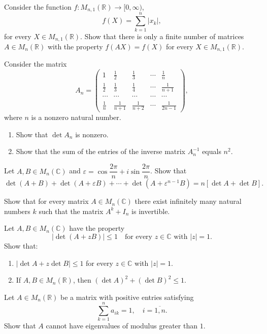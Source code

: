 \documentclass[12pt]{article}
\begin{document}
\begin{problems}
\item Consider the function $f : M_{n,1}(\mathbb{R}) \to [0,\infty)$,
$$f(X) = \sum_{k=1}^{n} |x_k|,$$
for every $X \in M_{n,1}(\mathbb{R})$. Show that there is only a finite number of matrices $A \in M_n(\mathbb{R})$ with the property $f(AX) = f(X)$ for every $X \in M_{n,1}(\mathbb{R})$.

\item Consider the matrix
$$A_n = \begin{pmatrix}
1 & \tfrac{1}{2} & \tfrac{1}{3} & \cdots & \tfrac{1}{n} \\[4pt]
\tfrac{1}{2} & \tfrac{1}{3} & \tfrac{1}{4} & \cdots & \tfrac{1}{n+1} \\[4pt]
\cdots & \cdots & \cdots & \cdots & \cdots \\[4pt]
\tfrac{1}{n} & \tfrac{1}{n+1} & \tfrac{1}{n+2} & \cdots & \tfrac{1}{2n-1}
\end{pmatrix},$$
where $n$ is a nonzero natural number.
\begin{enumerate}[label=\arabic*)]
\item Show that $\det A_n$ is nonzero.
\item Show that the sum of the entries of the inverse matrix $A_n^{-1}$ equals $n^2$.
\end{enumerate}

\item Let $A, B \in M_n(\mathbb{C})$ and $\varepsilon = \cos\dfrac{2\pi}{n} + i \sin \dfrac{2\pi}{n}$. Show that
$$\det(A+B) + \det(A+\varepsilon B) + \cdots + \det(A + \varepsilon^{n-1} B) = n\left[\det A + \det B\right].$$

\item Show that for every matrix $A \in M_n(\mathbb{C})$ there exist infinitely many natural numbers $k$ such that the matrix $A^k + I_n$ is invertible.

\item Let $A, B \in M_n(\mathbb{C})$ have the property
$$|\det(A + zB)| \le 1 \quad \text{for every } z \in \mathbb{C} \text{ with } |z| = 1.$$
Show that:
\begin{enumerate}[label=(\alph*)]
\item $|\det A + z \det B| \le 1$ for every $z \in \mathbb{C}$ with $|z| = 1$.
\item If $A, B \in M_n(\mathbb{R})$, then $(\det A)^2 + (\det B)^2 \le 1$.
\end{enumerate}

\item Let $A \in M_n(\mathbb{R})$ be a matrix with positive entries satisfying
$$\sum_{k=1}^{n} a_{ik} = 1, \quad i = \overline{1,n}.$$
Show that $A$ cannot have eigenvalues of modulus greater than $1$.


\end{problems}
\end{document}

